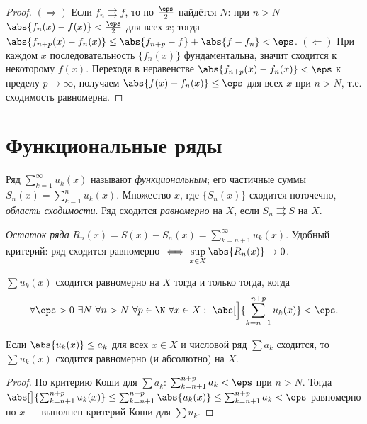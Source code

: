 \begin{proof}
$(\Rightarrow)$ Если $f_n\rightrightarrows f$, то по $\tfrac\eps2$ найдётся $N$: при $n>N$
$\abs{f_n(x)-f(x)}<\tfrac\eps2$ для всех $x$; тогда
$\abs{f_{n+p}(x)-f_n(x)}\le\abs{f_{n+p}-f}+\abs{f-f_n}<\eps$. $(\Leftarrow)$ При каждом $x$
последовательность $\{f_n(x)\}$ фундаментальна, значит сходится к некоторому $f(x)$. Переходя в
неравенстве $\abs{f_{n+p}(x)-f_n(x)}<\eps$ к пределу $p\to\infty$, получаем
$\abs{f(x)-f_n(x)}\le\eps$ для всех $x$ при $n>N$, т.е. сходимость равномерна.
\end{proof}

\section{Функциональные ряды}

\begin{definition}
Ряд $\displaystyle\sum_{k=1}^\infty u_k(x)$ называют \emph{функциональным}; его частичные суммы
$S_n(x)=\sum_{k=1}^n u_k(x)$. Множество $x$, где $\{S_n(x)\}$ сходится поточечно, — \emph{область
сходимости}. Ряд сходится \emph{равномерно} на $X$, если $S_n\rightrightarrows S$ на $X$.
\end{definition}

\begin{definition}
\emph{Остаток ряда} $\displaystyle R_n(x)=S(x)-S_n(x)=\sum_{k=n+1}^\infty u_k(x)$. Удобный
критерий: ряд сходится равномерно $\iff\displaystyle\sup_{x\in X}\abs{R_n(x)}\to0$.
\end{definition}

\begin{criterion}
$\sum u_k(x)$ сходится равномерно на $X$ тогда и только тогда, когда
\[
  \forall\eps>0\ \exists N\ \forall n>N\ \forall p\in\N\ \forall x\in X:\
  \abs[\Big]{\sum_{k=n+1}^{n+p}u_k(x)}<\eps .
\]
\end{criterion}

\begin{theorem}
Если $\abs{u_k(x)}\le a_k$ для всех $x\in X$ и числовой ряд $\sum a_k$ сходится, то
$\sum u_k(x)$ сходится равномерно (и абсолютно) на $X$.
\end{theorem}

\begin{proof}
По критерию Коши для $\sum a_k$: $\sum_{k=n+1}^{n+p}a_k<\eps$ при $n>N$. Тогда
$\abs[\big]{\sum_{k=n+1}^{n+p}u_k(x)}\le\sum_{k=n+1}^{n+p}\abs{u_k(x)}\le\sum_{k=n+1}^{n+p}a_k<\eps$
равномерно по $x$ — выполнен критерий Коши для $\sum u_k$.
\end{proof}


